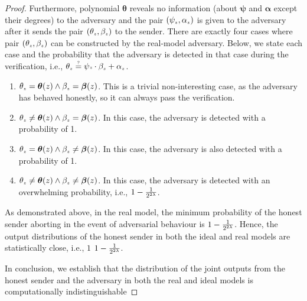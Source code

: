 \begin{proof}
 Furthermore, polynomial $\bm \theta$ reveals no information (about  $\bm \psi$ and $\bm\alpha$ except their degrees) to the adversary and the pair $(\psi_{\scriptscriptstyle z}, \alpha_{\scriptscriptstyle z})$ is given to the adversary after it sends the pair $(\theta_{\scriptscriptstyle z}, \beta_{\scriptscriptstyle z})$ to the sender. 
%
There are exactly four cases where pair $(\theta_{\scriptscriptstyle z}, \beta_{\scriptscriptstyle z})$ can be constructed by the real-model adversary. Below, we state each case and the probability that the adversary is detected in that case during the verification, i.e., $\theta_{\scriptscriptstyle z}\stackrel{\scriptscriptstyle ?}=\psi{\scriptscriptstyle z}\cdot \beta_{\scriptscriptstyle z}+\alpha_{\scriptscriptstyle z}$. 
%
\begin{enumerate}
%
\item $\theta_{\scriptscriptstyle z}= \bm\theta(z) \wedge  \beta_{\scriptscriptstyle  z}={\bm\beta}( z)$. This is a trivial non-interesting case, as the adversary has behaved honestly, so it can always pass the verification. %
%
\item $\theta_{\scriptscriptstyle z}\neq \bm\theta(z) \wedge  \beta_{\scriptscriptstyle  z}={\bm\beta}( z)$. In this case, the adversary is detected with a probability of 1. 
%
\item $\theta_{\scriptscriptstyle z}= \bm\theta(z) \wedge  \beta_{\scriptscriptstyle  z}\neq {\bm\beta}( z)$.  In this case, the adversary is also detected with a probability of 1.
%
\item $\theta_{\scriptscriptstyle z}\neq \bm\theta(z) \wedge  \beta_{\scriptscriptstyle  z} \neq {\bm\beta}( z)$. In this case, the adversary is detected with an overwhelming probability, i.e., $1-\frac{1}{2^{\scriptscriptstyle 2\lambda}}$. 
%
\end{enumerate}



As demonstrated above, in the real model, the minimum probability of the honest sender aborting in the event of adversarial behaviour is $1-\frac{1}{2^{\scriptscriptstyle 2\lambda}}$. Hence, the output distributions of the honest sender in both the ideal and real models are statistically close, i.e., $1$  $1-\frac{1}{2^{\scriptscriptstyle 2\lambda}}$. 

In conclusion, we establish that the distribution of the joint outputs from the honest sender and the adversary in both the real and ideal models is computationally indistinguishable

%
  \end{proof}
  
  
  
  
  
  
  
  
  
  
  
  